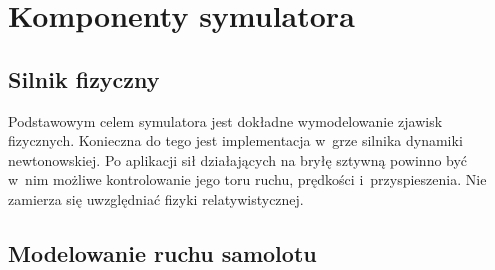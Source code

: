 \documentclass{mwrep}
\begin{document}
\section{Komponenty symulatora}

\subsection{Silnik fizyczny}

Podstawowym celem symulatora jest dokładne wymodelowanie zjawisk fizycznych. Konieczna do tego jest implementacja w~grze silnika dynamiki newtonowskiej. Po aplikacji sił działających na bryłę sztywną powinno być w~nim możliwe kontrolowanie jego toru ruchu, prędkości i~przyspieszenia. Nie zamierza się uwzględniać fizyki relatywistycznej.

\subsection{Modelowanie ruchu samolotu}
\end{document}
